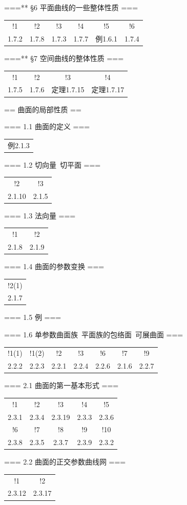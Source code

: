 ===** \S6 平面曲线的一些整体性质 ===
\begin{tabular}{cccccc}
    !1&!2&!3&!4&!5&!6\\
    1.7.2&1.7.8&1.7.3&1.7.7&例1.6.1&1.7.4
\end{tabular}

===** \S7 空间曲线的整体性质 ===
\begin{tabular}{cccc}
    !1&!2&!3&!4\\
    1.7.5&1.7.6&定理1.7.15&定理1.7.17
\end{tabular}

== 曲面的局部性质 ==

=== 1.1 曲面的定义 ===
\begin{tabular}{c}例2.1.3\end{tabular}

=== 1.2 切向量\ 切平面 ===
\begin{tabular}{cc}
    !2&!3\\2.1.10&2.1.5
\end{tabular}

=== 1.3 法向量 ===
\begin{tabular}{cc}
    !1&!2\\2.1.8&2.1.9
\end{tabular}

=== 1.4 曲面的参数变换 ===
\begin{tabular}{c}!2(1)\\2.1.7\end{tabular}

=== 1.5 例 ===

=== 1.6 单参数曲面族\ 平面族的包络面\ 可展曲面 ===
\begin{tabular}{ccccccc}
    !1(1)&!1(2)&!2&!3&!6&!7&!9\\
    2.2.2&2.2.3&2.2.1&2.2.4&2.2.6&2.1.6&2.2.7
\end{tabular}

=== 2.1 曲面的第一基本形式 ===
\begin{tabular}{ccccc}
    !1&!2&!3&!4&!5\\
    2.3.1&2.3.4&2.3.19&2.3.3&2.3.6\\
    !6&!7&!8&!9&!10\\
    2.3.8&2.3.5&2.3.7&2.3.9&2.3.2
\end{tabular}

=== 2.2 曲面的正交参数曲线网 ===
\begin{tabular}{cc}!1&!2\\2.3.12&2.3.17\end{tabular}

